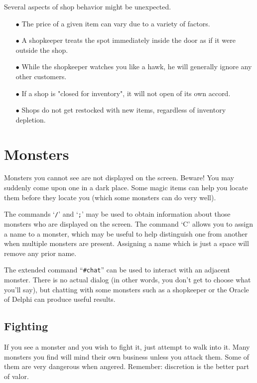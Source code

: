 Several aspects of shop behavior might be unexpected.
\begin{itemize}
\item[$\bullet$]
The price of a given item can vary due to a variety of factors.
\item[$\bullet$]
A shopkeeper treats the spot immediately inside the door as if it were
outside the shop.
\item[$\bullet$]
While the shopkeeper watches you like a hawk, he will generally ignore
any other customers.
\item[$\bullet$]
If a shop is "closed for inventory", it will not open of its own accord.
\item[$\bullet$]
Shops do not get restocked with new items, regardless of inventory depletion.
\end{itemize}

\section{Monsters}

Monsters you cannot see are not displayed on the screen.  Beware!
You may suddenly come upon one in a dark place.  Some magic items can
help you locate them before they locate you (which some monsters can do
very well).

The commands `{\tt /}' and `{\tt ;}' may be used to obtain information
about those
monsters who are displayed on the screen.  The command `C' allows you
to assign a name to a monster, which may be useful to help distinguish
one from another when multiple monsters are present.  Assigning a name
which is just a space will remove any prior name.

The extended command ``{\tt \#chat}'' can be used to interact with an adjacent
monster.  There is no actual dialog (in other words, you don't get to
choose what you'll say), but chatting with some monsters such as a
shopkeeper or the Oracle of Delphi can produce useful results.
\subsection*{Fighting}

If you see a monster and you wish to fight it, just attempt to walk
into it.  Many monsters you find will mind their own business unless
you attack them.  Some of them are very dangerous when angered.
Remember:  discretion is the better part of valor.

